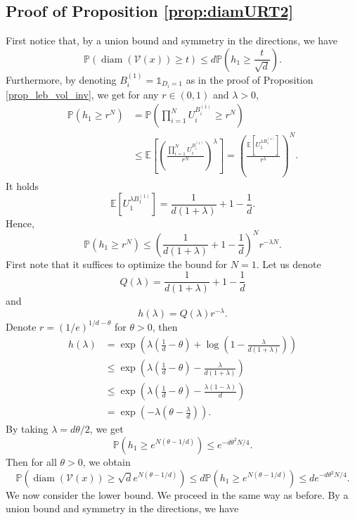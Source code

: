 \documentclass[paper=a4, fontsize=11pt]{scrartcl}
\newcommand{\diam}{\operatorname{diam}}
\newcommand{\pr}{\mathbb{P}}
\newcommand{\ind}{\mathds{1}}
\begin{document}
\subsection*{Proof of Proposition \ref{prop:diamURT2}}

First notice that, by a union bound and symmetry in the directions, we have \[ \pr(\diam (\mathcal{V}(x))\geq t) \leq d\pr \left(h_1 \geq \frac{t}{\sqrt{d}}\right). \]
Furthermore, by denoting $B_i^{(1)}=\ind_{D_i=1}$ as in the proof of Proposition \ref{prop_leb_vol_inv}, we get for any $r\in (0,1)$ and $\lambda>0$,
\begin{align*}
    \pr(h_1 \geq r^N) & = \pr\left(\prod_{i=1}^N U_i^{B_i^{(1)}} \geq r^N\right)\\
    & \leq \mathbb E\left[\left(\frac{\prod_{i=1}^N U_i^{B_i^{(1)}}}{r^N}\right)^\lambda \right]=\left(\frac{\mathbb E\left[{U_1^{\lambda B_1^{(1)}}}\right]}{r^{\lambda}}\right)^N. 
\end{align*}
It holds
\[
 \mathbb E\left[{U_1^{\lambda B_1^{(1)}}}\right]= \frac{1}{d(1+\lambda)}+1-\frac{1}{d}.
\]
Hence,
\[
 \pr(h_1 \geq r^N) \leq \left(\frac{1}{d(1+\lambda)}+1-\frac{1}{d}\right)^N r^{-\lambda N}.
\]
First note that it suffices to optimize the bound for $N=1$. Let us denote 
\[
Q(\lambda)= \frac{1}{d(1+\lambda)}+1-\frac{1}{d}
\]
and 
\[
h(\lambda)= Q(\lambda) r^{-\lambda}.
\]
Denote $r=(1/e)^{1/d-\theta}$ for $\theta>0$, then
\begin{align*}
    h(\lambda)
    & =   \exp\left(\lambda\left(\frac{1}{d}-\theta\right)+\log\left(1-\frac{\lambda}{d(1+\lambda)}\right)\right)\\
    & \leq  \exp\left(\lambda\left(\frac{1}{d}-\theta\right)-\frac{\lambda}{d(1+\lambda)}\right) \\
    & \leq  \exp\left(\lambda\left(\frac{1}{d}-\theta\right)-\frac{\lambda(1-\lambda)}{d}\right) \\
    & =   \exp\left(-\lambda\left(\theta-\frac{\lambda}{d}\right)\right).
\end{align*}
By taking $\lambda= d\theta/2$, we get
\[
 \pr(h_1 \geq e^{N(\theta-1/d)}) \leq e^{-d\theta^{2}N/4}.
\]
Then for all $\theta > 0$, we obtain
\[
 \pr(\diam (\mathcal{V}(x))\geq \sqrt{d}e^{N(\theta-1/d)}) \leq d\pr \left(h_1 \geq e^{N(\theta-1/d)}\right) \leq d e^{-d\theta^{2}N/4}.
\]
We now consider the lower bound. We proceed in the same way as before. By a union bound and symmetry in the directions, we have
\end{document}
